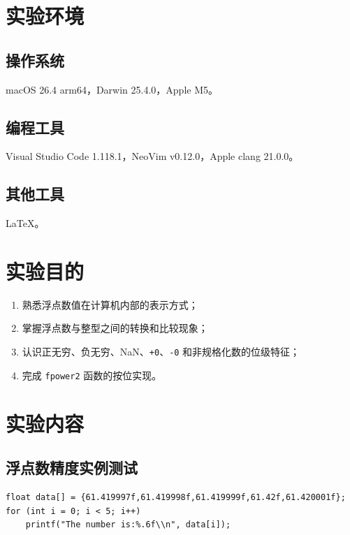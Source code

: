 \documentclass[12pt, a4paper]{academics}
\begin{document}
\makeacademicscover

\section{实验环境}

\subsection{操作系统}

macOS 26.4 arm64，Darwin 25.4.0，Apple M5。

\subsection{编程工具}

Visual Studio Code 1.118.1，NeoVim v0.12.0，Apple clang 21.0.0。

\subsection{其他工具}

\LaTeX{}。

\section{实验目的}

\begin{enumerate}
    \item 熟悉浮点数值在计算机内部的表示方式；
    \item 掌握浮点数与整型之间的转换和比较现象；
    \item 认识正无穷、负无穷、NaN、\texttt{+0}、\texttt{-0} 和非规格化数的位级特征；
    \item 完成 \texttt{fpower2} 函数的按位实现。
\end{enumerate}

\section{实验内容}

\subsection{浮点数精度实例测试}

\begin{verbatim}
float data[] = {61.419997f,61.419998f,61.419999f,61.42f,61.420001f};
for (int i = 0; i < 5; i++)
    printf("The number is:%.6f\\n", data[i]);
\end{verbatim}
\end{document}
